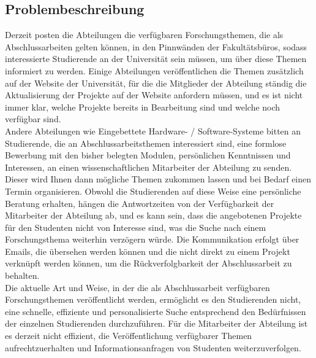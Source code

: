 \subsection{Problembeschreibung}
Derzeit posten die Abteilungen die verf\"ugbaren Forschungsthemen, die als Abschlussarbeiten gelten k\"onnen, in den Pinnw\"anden der Fakult\"atsb\"uros, sodass interessierte Studierende an der Universit\"at sein m\"ussen, um \"uber diese Themen informiert zu werden.
Einige Abteilungen ver\"offentlichen die Themen zus\"atzlich auf der Website der Universit\"at, f\"ur die die Mitglieder der Abteilung st\"andig die Aktualisierung der Projekte auf der Website anfordern m\"ussen, und es ist nicht immer klar, welche Projekte bereits in Bearbeitung sind und welche noch verf\"ugbar sind.\\

Andere Abteilungen wie Eingebettete Hardware- / Software-Systeme bitten an Studierende, die an Abschlussarbeitsthemen interessiert sind, eine formlose Bewerbung mit   den bisher belegten Modulen, pers\"onlichen Kenntnissen und Interessen, an einen wissenschaftlichen Mitarbeiter der Abteilung zu senden. Dieser wird Ihnen dann m\"ogliche Themen zukommen lassen und bei Bedarf einen Termin organisieren\cite{EHS:2020}.
Obwohl die Studierenden auf diese Weise eine pers\"onliche Beratung erhalten, h\"angen die Antwortzeiten von der Verf\"ugbarkeit der Mitarbeiter der Abteilung ab, und es kann sein, dass die angebotenen Projekte f\"ur den Studenten nicht von Interesse sind, was die Suche nach einem Forschungsthema weiterhin verz\"ogern w\"urde. Die Kommunikation erfolgt \"uber Emails, die \"ubersehen werden k\"onnen und die nicht direkt zu einem Projekt verkn\"upft werden k\"onnen, um die R\"uckverfolgbarkeit der Abschlussarbeit zu behalten.\\

Die aktuelle Art und Weise, in der die als Abschlussarbeit verf\"ugbaren Forschungsthemen ver\"offentlicht werden, erm\"oglicht es den Studierenden nicht, eine schnelle, effiziente und personalisierte Suche entsprechend den Bed\"urfnissen der einzelnen Studierenden durchzuf\"uhren. F\"ur die Mitarbeiter der Abteilung ist es derzeit nicht effizient, die Ver\"offentlichung verf\"ugbarer Themen aufrechtzuerhalten und Informationsanfragen von Studenten weiterzuverfolgen.